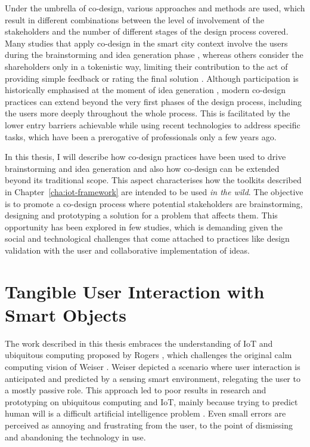 Under the umbrella of co-design, various approaches and methods are used, which result in different combinations between the level of involvement of the stakeholders and the number of different stages of the design process covered. Many studies that apply co-design in the smart city context involve the users during the brainstorming and idea generation phase \autocites{mitchell_empirical_2016}{schuurman_smart_2012}{mechant_e--deliberation_2012}{fu_building_2014}, whereas others consider the shareholders only in a tokenistic way, limiting their contribution to the act of providing simple feedback or rating the final solution \autocite{reiersolmoen_delta_2017}.
Although participation is historically emphasised at the moment of idea generation \autocite{cross_design_1971}, modern co-design practices can extend beyond the very first phases of the design process, including the users more deeply throughout the whole process. This is facilitated by the lower entry barriers achievable while using recent technologies to address specific tasks, which have been a prerogative of professionals only a few years ago.

In this thesis, I will describe how co-design practices have been used to drive brainstorming and idea generation and also how co-design can be extended beyond its traditional scope. This aspect characterises how the toolkits described in Chapter~\ref{cha:iot-framework} are intended to be used \textit{in the wild}. The objective is to promote a co-design process where potential stakeholders are brainstorming, designing and prototyping a solution for a problem that affects them.
This opportunity has been explored in few studies, which is demanding given the social and technological challenges that come attached to practices like design validation with the user and collaborative implementation of ideas.


\section{Tangible User Interaction with Smart Objects}

The work described in this thesis embraces the understanding of IoT and ubiquitous computing proposed by Rogers \autocite*{rogers_moving_2006}, which challenges the original calm computing vision of Weiser \autocite*{weiser_computer_1991}. Weiser depicted a scenario where user interaction is anticipated and predicted by a sensing smart environment, relegating the user to a mostly passive role.
This approach led to poor results in research and prototyping on ubiquitous computing and IoT, mainly because trying to predict human will is a difficult artificial intelligence problem \autocite{rogers_moving_2006}. Even small errors are perceived as annoying and frustrating from the user, to the point of dismissing and abandoning the technology in use.

